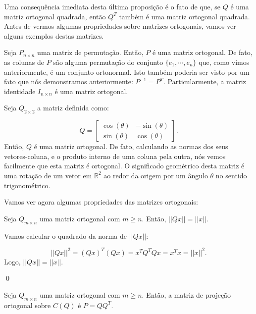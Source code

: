 Uma consequência imediata desta última proposição é o fato de que, se $Q$ é uma matriz ortogonal quadrada, então $Q^T$ também é uma matriz ortogonal quadrada. Antes de vermos algumas propriedades sobre matrizes ortogonais, vamos ver alguns exemplos destas matrizes.

\begin{Example}
	Seja $P_{n\times n}$ uma matriz de permutação. Então, $P$ é uma matriz ortogonal. De fato, as colunas de $P$ são alguma permutação do conjunto $\{e_1, \cdots, e_n\}$ que, como vimos anteriormente, é um conjunto ortonormal. Isto também poderia ser visto por um fato que nós demonstramos anteriormente: $P^{-1} = P^T$. Particularmente, a matriz identidade $I_{n\times n}$ é uma matriz ortogonal.
\end{Example}

\begin{Example}
	Seja $Q_{2\times 2}$ a matriz definida como:
	
	$$
	Q = \begin{bmatrix}
		\cos(\theta) & -\sin(\theta) \\
		\sin(\theta) & \cos(\theta)
	\end{bmatrix}.
	$$
	Então, $Q$ é uma matriz ortogonal. De fato, calculando as normas dos seus vetores-coluna, e o produto interno de uma coluna pela outra, nós vemos facilmente que esta matriz é ortogonal. O significado geométrico desta matriz é uma rotação de um vetor em $\mathbb{R}^2$ ao redor da origem por um ângulo $\theta$ no sentido trigonométrico.
\end{Example}

Vamos ver agora algumas propriedades das matrizes ortogonais:

\begin{Proposition}
	Seja $Q_{m\times n}$ uma matriz ortogonal com $m\geq n$. Então, $||Qx|| = ||x||$.
\end{Proposition}

\begin{Proof}
	Vamos calcular o quadrado da norma de $||Qx||$:
	
	$$
	||Qx||^2 = (Qx)^T(Qx) = x^TQ^TQx = x^Tx = ||x||^2.
	$$
	Logo, $||Qx|| = ||x||$.
	
	\qed
\end{Proof}

\begin{Proposition}
	Seja $Q_{m\times n}$ uma matriz ortogonal com $m\geq n$. Então, a matriz de projeção ortogonal sobre $C(Q)$ é $P = QQ^T$.
\end{Proposition}


